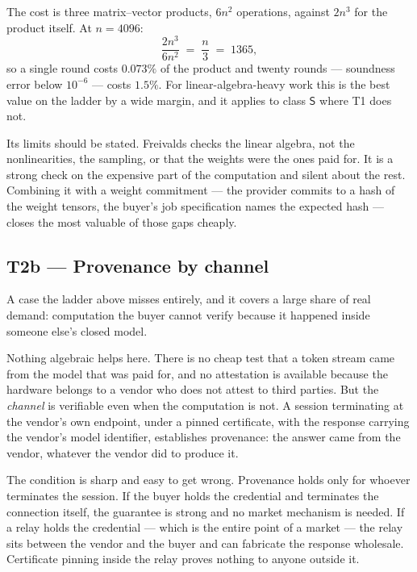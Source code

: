 \documentclass[11pt,a4paper]{article}
\begin{document}
The cost is three matrix--vector products, $6n^{2}$ operations, against $2n^{3}$
for the product itself. At $n = 4096$:
\begin{equation}
\frac{2n^{3}}{6n^{2}} \;=\; \frac{n}{3} \;=\; \num{1365},
\end{equation}
so a single round costs $0.073\%$ of the product and twenty rounds --- soundness
error below $10^{-6}$ --- costs $1.5\%$. For linear-algebra-heavy work this is
the best value on the ladder by a wide margin, and it applies to class
$\mathsf{S}$ where T1 does not.

Its limits should be stated. Freivalds checks the linear algebra, not the
nonlinearities, the sampling, or that the weights were the ones paid for. It is
a strong check on the expensive part of the computation and silent about the
rest. Combining it with a weight commitment --- the provider commits to a hash of
the weight tensors, the buyer's job specification names the expected hash --- closes
the most valuable of those gaps cheaply.

\subsection{T2b --- Provenance by channel}

A case the ladder above misses entirely, and it covers a large share of real
demand: computation the buyer cannot verify because it happened inside someone
else's closed model.

Nothing algebraic helps here. There is no cheap test that a token stream came
from the model that was paid for, and no attestation is available because the
hardware belongs to a vendor who does not attest to third parties. But the
\emph{channel} is verifiable even when the computation is not. A session
terminating at the vendor's own endpoint, under a pinned certificate, with the
response carrying the vendor's model identifier, establishes provenance: the
answer came from the vendor, whatever the vendor did to produce it.

The condition is sharp and easy to get wrong. Provenance holds only for whoever
terminates the session. If the buyer holds the credential and terminates the
connection itself, the guarantee is strong and no market mechanism is needed. If
a relay holds the credential --- which is the entire point of a market --- the
relay sits between the vendor and the buyer and can fabricate the response
wholesale. Certificate pinning inside the relay proves nothing to anyone outside
it.
\end{document}
